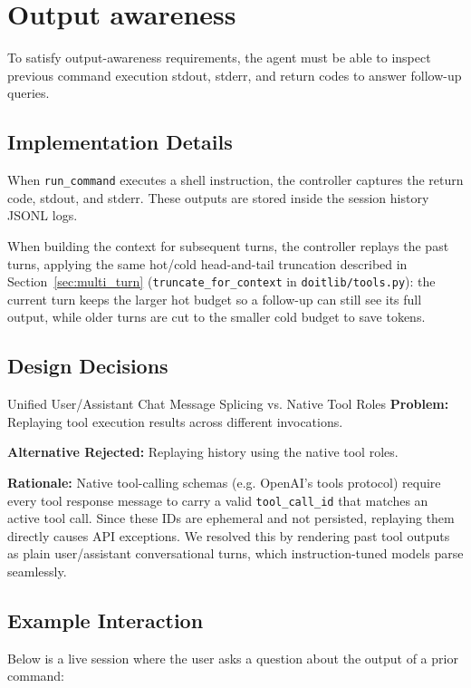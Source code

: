 \documentclass[11pt,a4paper]{article}
\begin{document}
\section{Output awareness}
\label{sec:output_awareness}
To satisfy output-awareness requirements, the agent must be able to inspect previous command execution stdout, stderr, and return codes to answer follow-up queries.

\subsection{Implementation Details}
When \texttt{run\_command} executes a shell instruction, the controller captures the return code, stdout, and stderr. These outputs are stored inside the session history JSONL logs.

When building the context for subsequent turns, the controller replays the past turns, applying the same hot/cold head-and-tail truncation described in Section~\ref{sec:multi_turn} (\texttt{truncate\_for\_context} in \texttt{doitlib/tools.py}): the current turn keeps the larger hot budget so a follow-up can still see its full output, while older turns are cut to the smaller cold budget to save tokens.

\subsection{Design Decisions}

\begin{decisionbox}{Unified User/Assistant Chat Message Splicing vs. Native Tool Roles}
    \textbf{Problem:} Replaying tool execution results across different invocations.
    
    \textbf{Alternative Rejected:} Replaying history using the native tool roles.
    
    \textbf{Rationale:} Native tool-calling schemas (e.g. OpenAI's tools protocol) require every tool response message to carry a valid \texttt{tool\_call\_id} that matches an active tool call. Since these IDs are ephemeral and not persisted, replaying them directly causes API exceptions. We resolved this by rendering past tool outputs as plain user/assistant conversational turns, which instruction-tuned models parse seamlessly.
\end{decisionbox}

\subsection{Example Interaction}
Below is a live session where the user asks a question about the output of a prior command:
\end{document}
